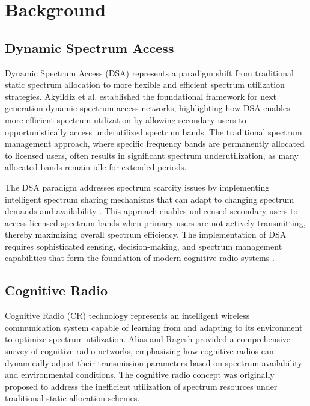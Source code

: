 \chapter{Background}
\label{Chapter2}
\section{\textbf{Dynamic Spectrum Access}}

Dynamic Spectrum Access (DSA) represents a paradigm shift from traditional static spectrum allocation to more flexible and efficient spectrum utilization strategies. Akyildiz et al. \cite{ref3} established the foundational framework for next generation dynamic spectrum access networks, highlighting how DSA enables more efficient spectrum utilization by allowing secondary users to opportunistically access underutilized spectrum bands. The traditional spectrum management approach, where specific frequency bands are permanently allocated to licensed users, often results in significant spectrum underutilization, as many allocated bands remain idle for extended periods.

The DSA paradigm addresses spectrum scarcity issues by implementing intelligent spectrum sharing mechanisms that can adapt to changing spectrum demands and availability \cite{ref2,ref3}. This approach enables unlicensed secondary users to access licensed spectrum bands when primary users are not actively transmitting, thereby maximizing overall spectrum efficiency. The implementation of DSA requires sophisticated sensing, decision-making, and spectrum management capabilities that form the foundation of modern cognitive radio systems \cite{ref25}.

\section{\textbf{Cognitive Radio}}

Cognitive Radio (CR) technology represents an intelligent wireless communication system capable of learning from and adapting to its environment to optimize spectrum utilization. Alias and Ragesh \cite{ref2} provided a comprehensive survey of cognitive radio networks, emphasizing how cognitive radios can dynamically adjust their transmission parameters based on spectrum availability and environmental conditions. The cognitive radio concept was originally proposed to address the inefficient utilization of spectrum resources under traditional static allocation schemes.

